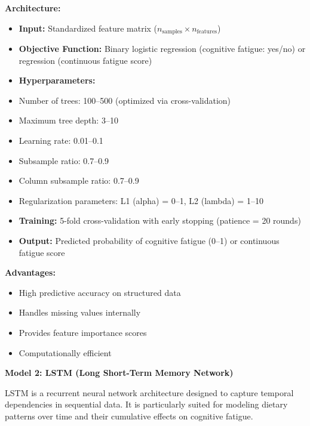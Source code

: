 \documentclass[journal,twoside,10pt]{IEEEtran}
\begin{document}
\textbf{Architecture:}
\begin{itemize}
\item \textbf{Input:} Standardized feature matrix ($n_{\text{samples}} \times n_{\text{features}}$)
\item \textbf{Objective Function:} Binary logistic regression (cognitive fatigue: yes/no) or regression (continuous fatigue score)
\item \textbf{Hyperparameters:}
\item Number of trees: 100--500 (optimized via cross-validation)
\item Maximum tree depth: 3--10
\item Learning rate: 0.01--0.1
\item Subsample ratio: 0.7--0.9
\item Column subsample ratio: 0.7--0.9
\item Regularization parameters: L1 (alpha) = 0--1, L2 (lambda) = 1--10
\item \textbf{Training:} 5-fold cross-validation with early stopping (patience = 20 rounds)
\item \textbf{Output:} Predicted probability of cognitive fatigue (0--1) or continuous fatigue score
\end{itemize}

\textbf{Advantages:}
\begin{itemize}
\item High predictive accuracy on structured data
\item Handles missing values internally
\item Provides feature importance scores
\item Computationally efficient
\end{itemize}

\textbf{Model 2: LSTM (Long Short-Term Memory Network)}

LSTM is a recurrent neural network architecture designed to capture temporal dependencies in sequential data. It is particularly suited for modeling dietary patterns over time and their cumulative effects on cognitive fatigue.
\end{document}
